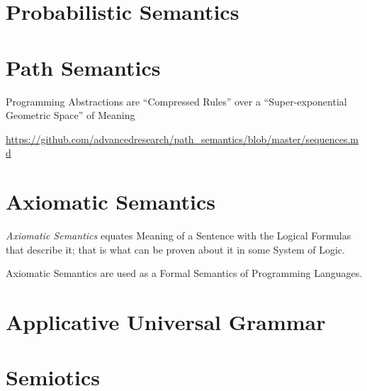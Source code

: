 \section{Probabilistic Semantics}\label{sec:probabilistic_semantics}

\section{Path Semantics}\label{sec:path_semantics}

Programming Abstractions are ``Compressed Rules'' over a
``Super-exponential Geometric Space'' of Meaning

\url{https://github.com/advancedresearch/path_semantics/blob/master/sequences.md}



\section{Axiomatic Semantics}\label{sec:axiomatic_semantics}

\emph{Axiomatic Semantics} equates Meaning of a Sentence with the
Logical Formulas that describe it; that is what can be proven about it
in some System of Logic.

Axiomatic Semantics are used as a Formal Semantics of Programming
Languages.



\section{Applicative Universal Grammar}
\label{sec:applicative_universal_grammar}

\section{Semiotics}\label{sec:semiotics}

